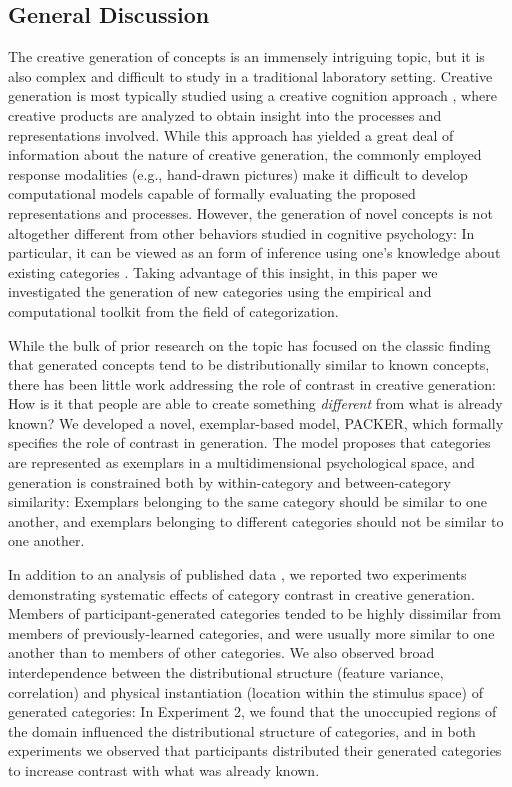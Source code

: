 \documentclass[12pt]{article}
\begin{document}
\begin{flushleft}


\section{General Discussion}

The creative generation of concepts is an immensely intriguing topic, but it is also complex and difficult to study in a traditional laboratory setting. Creative generation is most typically studied using a creative cognition approach \citep{finke1992creative,smith1995creative}, where creative products \citep[such as drawings of alien plants and animals;][]{ward1994structured} are analyzed to obtain insight into the processes and representations involved. While this approach has yielded a great deal of information about the nature of creative generation, the commonly employed response modalities (e.g., hand-drawn pictures) make it difficult to develop computational models capable of formally evaluating the proposed representations and processes. However, the generation of novel concepts is not altogether different from other behaviors studied in cognitive psychology: In particular, it can be viewed as an form of inference using one's knowledge about existing categories \citep{kemp2014taxonomy,kurtz2015human}. Taking advantage of this insight, in this paper we investigated the generation of new categories using the empirical and computational toolkit from the field of categorization.

While the bulk of prior research on the topic has focused on the classic finding that generated concepts tend to be distributionally similar to known concepts, there has been little work addressing the role of contrast in creative generation: How is it that people are able to create something {\em different} from what is already known? We developed a novel, exemplar-based model, PACKER, which formally specifies the role of contrast in generation. The model proposes that categories are represented as exemplars in a multidimensional psychological space, and generation is constrained both by within-category and between-category similarity: Exemplars belonging to the same category should be similar to one another, and exemplars belonging to different categories should not be similar to one another. 

In addition to an analysis of published data \citep[][Experiment 3]{jern2013probabilistic}, we reported two experiments demonstrating systematic effects of category contrast in creative generation. Members of participant-generated categories tended to be highly dissimilar from members of previously-learned categories, and were usually more similar to one another than to members of other categories. We also observed broad interdependence between the distributional structure (feature variance, correlation) and physical instantiation (location within the stimulus space) of generated categories: In Experiment 2, we found that the unoccupied regions of the domain influenced the distributional structure of categories, and in both experiments we observed that participants distributed their generated categories to increase contrast with what was already known. 


\end{flushleft}
\end{document}
